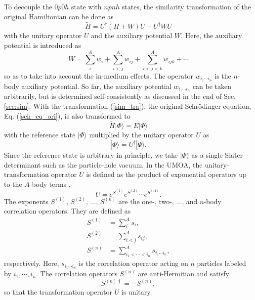 \documentclass[aps,prc, dvips, twocolumn,groupedaddress,showkeys,showpacs,floatfix,superscriptaddress]{revtex4-1}
\newcommand{\<}{\langle}
\renewcommand{\>}{\rangle}
\begin{document}
To decouple the $0p0h$ state with $npnh$ states,
 the similarity transformation of the original Hamiltonian can be done as
\begin{equation}
\label{sim_tra}
 \widetilde{H}=U^{\dag}(H+W)U - U^{\dag}WU
\end{equation}
with the unitary operator $U$ and the auxiliary potential $W$.
Here, the auxiliary potential is introduced as
\begin{equation}
 \label{def_W}
  W=\sum_{i}^{A}w_{i} + \sum_{i<j}^{A}w_{ij}+\sum_{i<j<k}^{A} w_{ijk}+ \cdots
\end{equation}
so as to take into account the in-medium effects.
The operator $w_{i_{1}\cdots i_{n}}$ is the $n$-body auxiliary potential.
So far, the auxiliary potential $w_{i_{1} \cdots i_{n}}$ can be taken arbitrarily,
but is determined self-consistently as discussed in the end of Sec. \ref{sec:sim}.
 With the transformation (\ref{sim_tra}), the original Schr\"odinger
 equation, Eq. (\ref{sch_eq_ori}), is also transformed to
 \begin{equation}
   \widetilde{H} |\Phi\> = E |\Phi\>
 \end{equation}
with the reference state $|\Phi\>$ multiplied by the unitary operator $U$ as
\begin{equation}
  |\Phi\> = U^{\dag} |\Psi\>.
\end{equation}
Since the reference state is arbitrary in principle,
we take $|\Phi\>$ as a single Slater determinant
 such as the particle-hole vacuum.
In the UMOA, the unitary-transformation operator $U$ is defined as the product
of exponential operators up to the $A$-body terms \cite{Suzuki:1988},
\begin{equation}
\label{uni_op}
 U=e^{S^{(1)}}e^{S^{(2)}}\cdots e^{S^{(A)}}.
\end{equation}
The exponents $S^{(1)}$, $S^{(2)}$, $\dots$, $S^{(n)}$ are
the one-, two-, $\dots$, and $n$-body correlation operators.
They are defined as
\begin{align}
 S^{(1)} &= \sum_{i}^{A}s_{i}, \\
 S^{(2)} &= \sum_{i<j}^{A} s_{ij}, \\
 S^{(n)} &= \sum_{i_{1}<\cdots < i_{n}}^{A} s_{i_{1}\cdots i_{n}},
\end{align}
respectively.
Here, $s_{i_{1}\cdots i_{n}}$ is the correlation operator
 acting on $n$ particles labeled by $i_{1}, \cdots, i_{n}$.
The correlation operators $S^{(n)}$ are anti-Hermitian and satisfy
\begin{equation}
\label{S_con}
 S^{(n)\dag} = -S^{(n)},
\end{equation}
so that the transformation operator $U$ is unitary.
\end{document}
